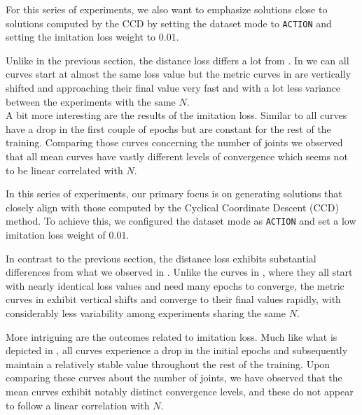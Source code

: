 For this series of experiments, we also want to emphasize solutions close to solutions computed by the CCD by setting the dataset mode to \texttt{ACTION} and setting the imitation loss weight to $0.01$. 

Unlike in the previous section, the distance loss differs a lot from . In  we can all curves start at almost the same loss value but the metric curves in  are vertically shifted and approaching their final value very fast and with a lot less variance between the experiments with the same $N$.\\
A bit more interesting are the results of the imitation loss. Similar to  all curves have a drop in the first couple of epochs but are constant for the rest of the training. Comparing those curves concerning the number of joints we observed that all mean curves have vastly different levels of convergence which seems not to be linear correlated with $N$.


In this series of experiments, our primary focus is on generating solutions that closely align with those computed by the Cyclical Coordinate Descent (CCD) method. To achieve this, we configured the dataset mode as \texttt{ACTION} and set a low imitation loss weight of $0.01$.

In contrast to the previous section, the distance loss exhibits substantial differences from what we observed in . Unlike the curves in , where they all start with nearly identical loss values and need many epochs to converge, the metric curves in  exhibit vertical shifts and converge to their final values rapidly, with considerably less variability among experiments sharing the same $N$.

More intriguing are the outcomes related to imitation loss. Much like what is depicted in , all curves experience a drop in the initial epochs and subsequently maintain a relatively stable value throughout the rest of the training. Upon comparing these curves about the number of joints, we have observed that the mean curves exhibit notably distinct convergence levels, and these do not appear to follow a linear correlation with $N$.


